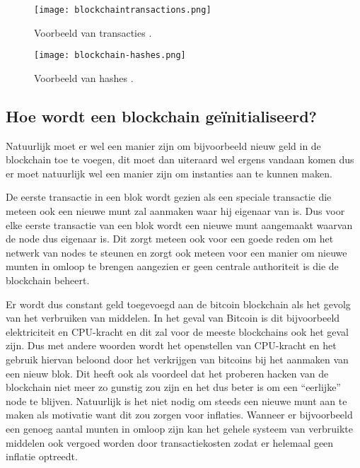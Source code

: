 \begin{figure}
	\texttt{[image: blockchaintransactions.png]}
	\caption{Voorbeeld van transacties \textcite{Nakamoto2008}.}
	\label{fig:blockchain-transaction-example}
\end{figure}
\begin{figure}
	\texttt{[image: blockchain-hashes.png]}
	\caption{Voorbeeld van hashes \textcite{blockchain.info}.}
	\label{fig:blockchain-hash-example}
\end{figure}

\subsection{Hoe wordt een blockchain geïnitialiseerd?}
Natuurlijk moet er wel een manier zijn om bijvoorbeeld nieuw geld in de blockchain toe te voegen, dit moet dan uiteraard wel ergens vandaan komen dus er moet natuurlijk wel een manier zijn om instanties aan te kunnen maken. 

De eerste transactie in een blok wordt gezien als een speciale transactie die meteen ook een nieuwe munt zal aanmaken waar hij eigenaar van is. Dus voor elke eerste transactie van een blok wordt een nieuwe munt aangemaakt waarvan de node dus eigenaar is. Dit zorgt meteen ook voor een goede reden om het netwerk van nodes te steunen en zorgt ook meteen voor een manier om nieuwe munten in omloop te brengen aangezien er geen centrale authoriteit is die de blockchain beheert. 

Er wordt dus constant geld toegevoegd aan de bitcoin blockchain als het gevolg van het verbruiken van middelen. In het geval van Bitcoin is dit bijvoorbeeld elektriciteit en CPU-kracht en dit zal voor de meeste blockchains ook het geval zijn. Dus met andere woorden wordt het openstellen van CPU-kracht en het gebruik hiervan beloond door het verkrijgen van bitcoins bij het aanmaken van een nieuw blok. Dit heeft ook als voordeel dat het proberen hacken van de blockchain niet meer zo gunstig zou zijn en het dus beter is om een ``eerlijke'' node te blijven. Natuurlijk is het niet nodig om steeds een nieuwe munt aan te maken als motivatie want dit zou zorgen voor inflaties. Wanneer er bijvoorbeeld een genoeg aantal munten in omloop zijn kan het gehele systeem van verbruikte middelen ook vergoed worden door transactiekosten zodat er helemaal geen inflatie optreedt.

